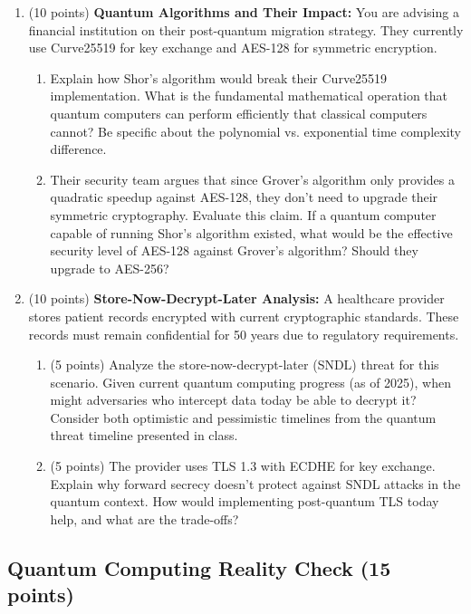 \documentclass[10pt,a4paper,american]{article}
\begin{document}
\begin{enumerate}
	\item (10 points) \textbf{Quantum Algorithms and Their Impact:}
	      You are advising a financial institution on their post-quantum migration strategy. They currently use Curve25519 for key exchange and AES-128 for symmetric encryption.
	      \begin{enumerate}
		      \item Explain how Shor's algorithm would break their Curve25519 implementation. What is the fundamental mathematical operation that quantum computers can perform efficiently that classical computers cannot? Be specific about the polynomial vs. exponential time complexity difference.
		      \item Their security team argues that since Grover's algorithm only provides a quadratic speedup against AES-128, they don't need to upgrade their symmetric cryptography. Evaluate this claim. If a quantum computer capable of running Shor's algorithm existed, what would be the effective security level of AES-128 against Grover's algorithm? Should they upgrade to AES-256?
	      \end{enumerate}
	\item (10 points) \textbf{Store-Now-Decrypt-Later Analysis:}
	      A healthcare provider stores patient records encrypted with current cryptographic standards. These records must remain confidential for 50 years due to regulatory requirements.

	      \begin{enumerate}
		      \item (5 points) Analyze the store-now-decrypt-later (SNDL) threat for this scenario. Given current quantum computing progress (as of 2025), when might adversaries who intercept data today be able to decrypt it? Consider both optimistic and pessimistic timelines from the quantum threat timeline presented in class.
		      \item (5 points) The provider uses TLS 1.3 with ECDHE for key exchange. Explain why forward secrecy doesn't protect against SNDL attacks in the quantum context. How would implementing post-quantum TLS today help, and what are the trade-offs?
	      \end{enumerate}
\end{enumerate}

\subsection{Quantum Computing Reality Check (15 points)}
\end{document}
